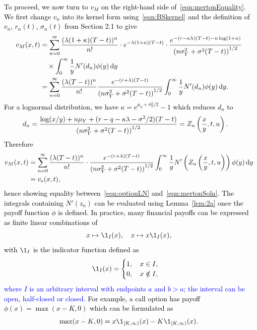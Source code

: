 \textcolor{black}{
To proceed, we now turn to $v_M$ on the right-hand side of~\eqref{eqn:mertonEquality}. We first change $v_n$ into its kernel form using~\eqref{eqn:BSkernel} and the definition of $v_n$, $r_n(t)$, $\sigma_n(t)$ from Section 2.1 to give
	\begin{align*}
		v_M(x,t) &=  \displaystyle\sum\limits_{n=0}^\infty\frac{(\lambda(1+\kappa)(T-t))^n}{n!}\cdot e^{-\lambda(1+\kappa)(T-t)}\cdot \frac{e^{-(r-\kappa\lambda)(T-t)-n\log(1+\kappa)}}{\left(n\sigma_Y^2 + \sigma^2(T-t)\right)^{1/2}} \\
		& \quad {} \times \int_0^\infty \frac{1}{y}N'(d_n) \phi(y) \, \mathrm d y \\
		&= \displaystyle\sum\limits_{n=0}^\infty\frac{(\lambda(T-t))^n}{n!}\frac{e^{-(r+\lambda)(T-t)}}{\left(n\sigma_Y^2 + \sigma^2(T-t)\right)^{1/2}}\int_0^\infty \frac{1}{y}N'(d_n) \phi(y) \, \mathrm d y.
	\end{align*}
For a lognormal distribution, we have $\kappa = e^{\mu_Y + \sigma_Y^2/2} - 1$ which reduces $d_n$ to
	\begin{align*}
		d_n &= \frac{\log(x/y) + n\mu_Y + (r - q - \kappa\lambda - \sigma^2/2)(T-t)}{\left( n\sigma_Y^2 + \sigma^2(T-t) \right)^{1/2}} = Z_n\left(\frac{x}{y},t,u\right).
	\end{align*}
Therefore
	\begin{align*}
		v_M(x,t) &=  \displaystyle\sum\limits_{n=0}^\infty\frac{(\lambda(T-t))^n}{n!}\cdot\frac{e^{-(r+\lambda)(T-t)}}{\left(n\sigma_Y^2 + \sigma^2(T-t)\right)^{1/2}}\int_0^\infty \frac{1}{y}N'\left(Z_n\left( \frac{x}{y},t,u \right)\right) \phi(y) \, \mathrm d y \\
		 &= v_\text{e}(x,t),
	\end{align*}
hence showing equality between~\eqref{eqn:optionLN} and~\eqref{eqn:mertonSoln}. The integrals containing $N'(z_n)$ can be evaluated using Lemma~\ref{lem:2a} once the payoff function $\phi$ is defined. In practice, \textcolor{black}{many} financial payoffs can be expressed as finite linear combinations of
	$$
		x \mapsto \1_{I}(x), \quad x \mapsto x\1_{I}(x),
	$$
with $\1_I$ is the indicator function defined as
	$$
		\1_I(x) = \begin{cases}
			1, \quad x \in I, \\
			0, \quad x \notin I,
		\end{cases}
	$$
\textcolor{blue}{where $I$ is an arbitrary interval with endpoints $a$ and $b > a$; the interval can be open, half-closed or closed.} For example, a call option has payoff $\phi(x) = \max(x-K,0)$ which can be formulated as
	$$
		\max(x-K,0) = x\1_{[K,\infty)}(x) - K\1_{[K,\infty)}(x).
$$}
